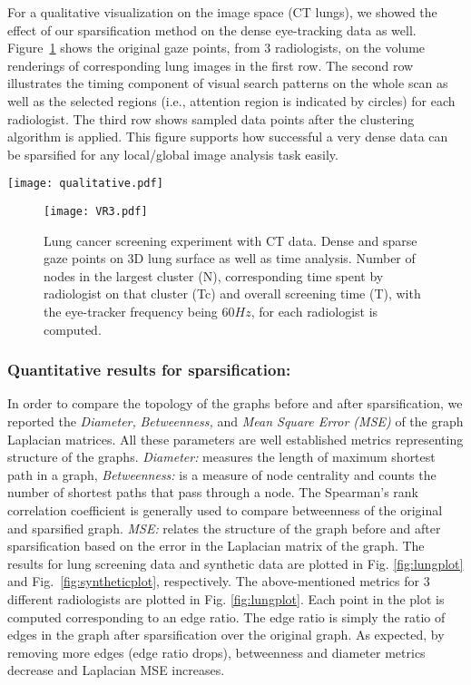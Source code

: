 \documentclass[preprint,12pt]{elsarticle}
\begin{document}
For a qualitative visualization on the image space (CT lungs), we showed the effect of our sparsification method on the dense eye-tracking data as well. Figure~\ref{fig:VRlung} shows the original gaze points, from $3$ radiologists, on the volume renderings of corresponding lung images in the first row. The second row illustrates the timing component of visual search patterns on the whole scan as well as the selected regions (i.e., attention region is indicated by circles) for each radiologist. The third row shows sampled data points after the clustering algorithm is applied. This figure supports how successful a very dense data can be sparsified for any local/global image analysis task easily.


\begin{figure*}
\centering
\texttt{[image: qualitative.pdf]}
\caption{Lung cancer screening experiments with CT data. First column: dense gaze patterns. Second column: attention based clustering. Third column: nodes in clusters are reduced. Fourth column: sparse graph after further reducing edges. \label{fig:qualitativelung}}
\end{figure*}
\begin{figure}[h]
\texttt{[image: VR3.pdf]}
\caption{Lung cancer screening experiment with CT data. Dense and sparse gaze points on 3D lung surface as well as time analysis. Number of nodes in the largest cluster (N), corresponding time spent by radiologist on that cluster (Tc) and overall screening time (T), with the eye-tracker frequency being $60Hz$, for each radiologist is computed. \label{fig:VRlung}}
\end{figure}


\subsubsection{Quantitative results for sparsification:} In order to compare the topology of the graphs before and after sparsification, we reported the \textit{Diameter,} \textit{Betweenness,} and \textit{Mean Square Error (MSE)} of the graph Laplacian matrices. All these parameters are well established metrics representing structure of the graphs. \textit{Diameter:} measures the length of maximum shortest path in a graph, \textit{Betweenness:} is a measure of node centrality and counts the number of shortest paths that pass through a node. The Spearman's rank correlation coefficient is generally used to compare betweenness of the original and sparsified graph. \textit{MSE:} relates the structure of the graph before and after sparsification based on the error in the Laplacian matrix of the graph. The results for lung screening data and synthetic data are plotted in Fig. \ref{fig:lungplot} and Fig.~\ref{fig:syntheticplot}, respectively. The above-mentioned metrics for $3$ different radiologists are plotted in Fig. \ref{fig:lungplot}. Each point in the plot is computed corresponding to an edge ratio. The edge ratio is simply the ratio of edges in the graph after sparsification over the original graph. As expected, by removing more edges (edge ratio drops), betweenness and diameter metrics decrease and Laplacian MSE increases.
\end{document}
